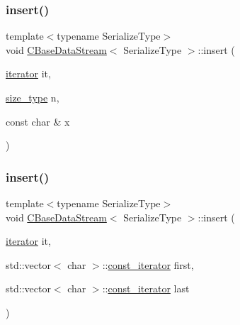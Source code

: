\subsubsection{\texorpdfstring{insert()}{insert()}\hspace{0.1cm}{\footnotesize\ttfamily [2/4]}}
{\footnotesize\ttfamily template$<$typename Serialize\+Type$>$ \\
void \mbox{\hyperlink{class_c_base_data_stream}{C\+Base\+Data\+Stream}}$<$ Serialize\+Type $>$\+::insert (\begin{DoxyParamCaption}\item[{\mbox{\hyperlink{class_c_base_data_stream_a23e0e0af1c68dd36c27162036b6d048d}{iterator}}}]{it,  }\item[{\mbox{\hyperlink{class_c_base_data_stream_ad042ddea628c43357b9b13be89c71964}{size\+\_\+type}}}]{n,  }\item[{const char \&}]{x }\end{DoxyParamCaption})\hspace{0.3cm}{\ttfamily [inline]}}

\mbox{\label{class_c_base_data_stream_a57dd36b154277cc2997d9405bf514c3e}} 
\subsubsection{\texorpdfstring{insert()}{insert()}\hspace{0.1cm}{\footnotesize\ttfamily [3/4]}}
{\footnotesize\ttfamily template$<$typename Serialize\+Type$>$ \\
void \mbox{\hyperlink{class_c_base_data_stream}{C\+Base\+Data\+Stream}}$<$ Serialize\+Type $>$\+::insert (\begin{DoxyParamCaption}\item[{\mbox{\hyperlink{class_c_base_data_stream_a23e0e0af1c68dd36c27162036b6d048d}{iterator}}}]{it,  }\item[{std\+::vector$<$ char $>$\+::\mbox{\hyperlink{class_c_base_data_stream_a9cf3080c5a75c94568980a59d3aab3ad}{const\+\_\+iterator}}}]{first,  }\item[{std\+::vector$<$ char $>$\+::\mbox{\hyperlink{class_c_base_data_stream_a9cf3080c5a75c94568980a59d3aab3ad}{const\+\_\+iterator}}}]{last }\end{DoxyParamCaption})\hspace{0.3cm}{\ttfamily [inline]}}

